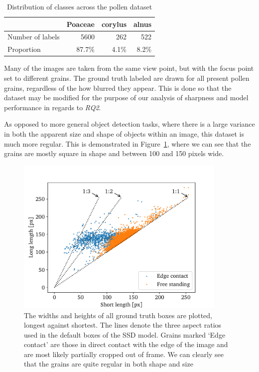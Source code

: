 \begin{table}[htb]
  \caption[Class distribution across the dataset]{Distribution of classes across the pollen dataset}\label{tab:dataset}
  \centering 
  \begin{tabular}{lrrr} \toprule
                      & Poaceae & corylus & alnus \\ \midrule
    Number of labels  & 5600    & 262     & 522 \\
    Proportion        & 87.7\%  & 4.1\%   & 8.2\% \\ \bottomrule
  \end{tabular}
\end{table}


Many of the images are taken from the same view point, but with the focus point set to different grains. The ground truth labeled are drawn for all present pollen grains, regardless of the how blurred they appear. This is done so that the dataset may be modified for the purpose of our analysis of sharpness and model performance in regards to \textit{RQ2}.

As opposed to more general object detection tasks, where there is a large variance in both the apparent size and shape of objects within an image, this dataset is much more regular. This is demonstrated in Figure~\ref{fig:aspect}, where we can see that the grains are mostly square in shape and between 100 and 150 pixels wide.

\begin{figure}[htb]
  \centering
  \includegraphics[width=0.9\textwidth]{figs/aspect_ratio.pdf}
  \caption[Aspect ratios in the dataset]{The widths and heights of all ground truth boxes are plotted, longest against shortest. The lines denote the three aspect ratios used in the default boxes of the SSD model. Grains marked `Edge contact' are those in direct contact with the edge of the image and are most likely partially cropped out of frame. We can clearly see that the grains are quite regular in both shape and size}\label{fig:aspect}
\end{figure}

